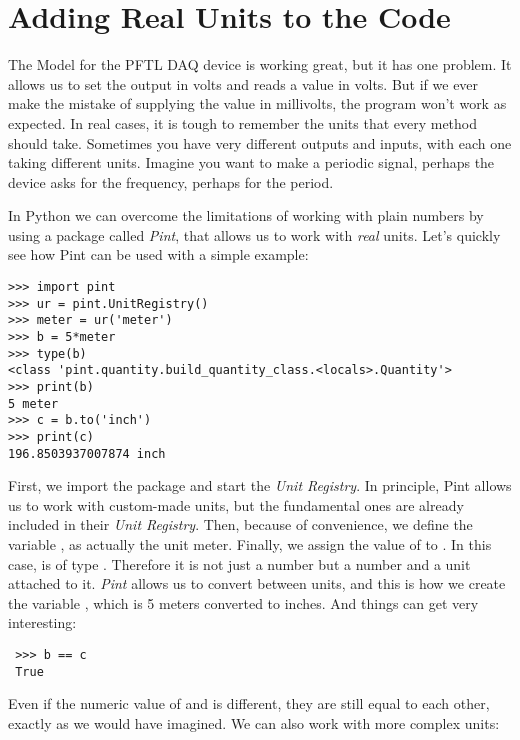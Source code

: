
\section{Adding Real Units to the Code}\label{sec:pint}
The Model for the {PFTL DAQ} device is working great, but it has one problem. It allows us to set the output in volts and reads a value in volts. But if we ever make the mistake of supplying the value in millivolts, the program won't work as expected. In real cases, it is tough to remember the units that every method should take. Sometimes you have very different outputs and inputs, with each one taking different units. Imagine you want to make a periodic signal, perhaps the device asks for the frequency, perhaps for the period.

In Python we can overcome the limitations of working with plain numbers by using a package called \emph{Pint}, that allows us to work with \emph{real} units. Let's quickly see how Pint can be used with a simple example:

\begin{verbatim}
>>> import pint
>>> ur = pint.UnitRegistry()
>>> meter = ur('meter')
>>> b = 5*meter
>>> type(b)
<class 'pint.quantity.build_quantity_class.<locals>.Quantity'>
>>> print(b)
5 meter
>>> c = b.to('inch')
>>> print(c)
196.8503937007874 inch
\end{verbatim}

First, we import the package and start the \emph{Unit Registry}. In principle, Pint allows us to work with custom-made units, but the fundamental ones are already included in their \emph{Unit Registry}. Then, because of convenience, we define the variable , as actually the unit meter. Finally, we assign the value of  to . In this case,  is of type . Therefore it is not just a number but a number and a unit attached to it. \emph{Pint} allows us to convert between units, and this is how we create the variable , which is 5 meters converted to inches. And things can get very interesting:

\begin{verbatim}
 >>> b == c
 True
\end{verbatim}

Even if the numeric value of  and  is different, they are still equal to each other, exactly as we would have imagined. We can also work with more complex units:

